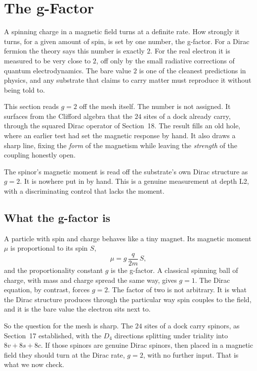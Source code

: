 \section{The g-Factor}

A spinning charge in a magnetic field turns at a definite rate. How strongly it turns, for a given amount of spin, is set by one number, the g-factor. For a Dirac fermion the theory says this number is exactly $2$. For the real electron it is measured to be very close to $2$, off only by the small radiative corrections of quantum electrodynamics. The bare value $2$ is one of the cleanest predictions in physics, and any substrate that claims to carry matter must reproduce it without being told to.

This section reads $g = 2$ off the mesh itself. The number is not assigned. It surfaces from the Clifford algebra that the $24$ sites of a dock already carry, through the squared Dirac operator of Section~18. The result fills an old hole, where an earlier test had set the magnetic response by hand. It also draws a sharp line, fixing the \emph{form} of the magnetism while leaving the \emph{strength} of the coupling honestly open.

\begin{principle}
The spinor's magnetic moment is read off the substrate's own Dirac structure as $g = 2$. It is nowhere put in by hand. This is a genuine measurement at depth L2, with a discriminating control that lacks the moment.
\end{principle}

\subsection{What the g-factor is}

A particle with spin and charge behaves like a tiny magnet. Its magnetic moment $\mu$ is proportional to its spin $S$,
\[
\mu = g \, \frac{q}{2m} \, S,
\]
and the proportionality constant $g$ is the g-factor. A classical spinning ball of charge, with mass and charge spread the same way, gives $g = 1$. The Dirac equation, by contrast, forces $g = 2$. The factor of two is not arbitrary. It is what the Dirac structure produces through the particular way spin couples to the field, and it is the bare value the electron sits next to.

So the question for the mesh is sharp. The $24$ sites of a dock carry spinors, as Section~17 established, with the $D_4$ directions splitting under triality into $8v + 8s + 8c$. If those spinors are genuine Dirac spinors, then placed in a magnetic field they should turn at the Dirac rate, $g = 2$, with no further input. That is what we now check.

